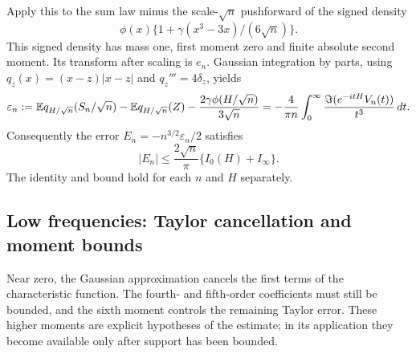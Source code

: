 Apply this to the sum law minus the scale-$\sqrt n$ pushforward of
the signed density
\[
 \phi(x)\{1+\gamma(x^3-3x)/(6\sqrt n)\}.
\]
This signed density has mass one, first moment zero and finite absolute
second moment. Its transform after scaling is $e_n$. Gaussian integration
by parts, using $q_z(x)=(x-z)|x-z|$ and $q_z'''=4\delta_z$, yields
\[
 \varepsilon_n:=\mathbb E q_{H/\sqrt n}(S_n/\sqrt n)
 -\mathbb E q_{H/\sqrt n}(Z)-\frac{2\gamma\phi(H/\sqrt n)}{3\sqrt n}
 =-\frac4{\pi n}\int_0^\infty
 \frac{\Im(e^{-itH}V_n(t))}{t^3}\,dt.
\]
Consequently the error $E_n=-n^{3/2}\varepsilon_n/2$ satisfies
\begin{equation}\label{v9:fourier:ledger}
 |E_n|\le\frac{2\sqrt n}{\pi}\{I_0(H)+I_\infty\}.
\end{equation}
The identity and bound hold for each $n$ and $H$ separately.

\subsection{Low frequencies: Taylor cancellation and moment bounds}

Near zero, the Gaussian approximation cancels the first terms of the
characteristic function. The fourth- and fifth-order coefficients must
still be bounded, and the sixth moment controls the remaining Taylor
error. These higher moments are explicit hypotheses of the estimate;
in its application they become available only after support has been
bounded.

